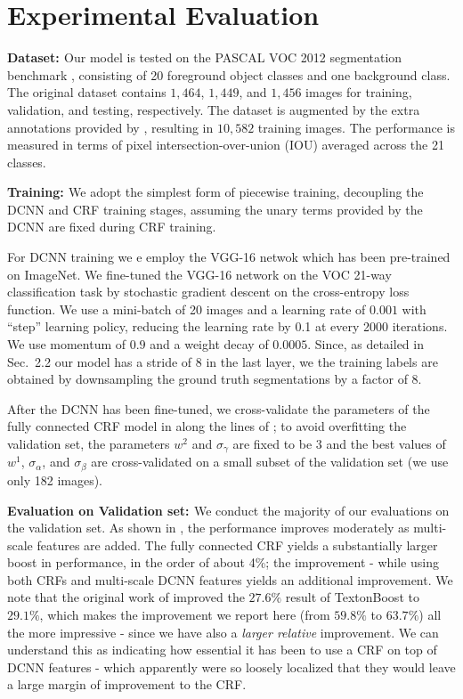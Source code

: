 \section{Experimental Evaluation}
\label{sec:experiments}

{\bf{Dataset: }} Our model is tested on the PASCAL VOC 2012 segmentation benchmark \citep{everingham2014pascal}, consisting of 20 foreground object classes and one background class. The original dataset contains $1,464$, $1,449$, and $1,456$ images for training, validation, and testing, respectively. The dataset is augmented by the extra annotations provided by \citep{hariharan2011semantic}, resulting in $10,582$ training images. The performance is measured in terms of pixel intersection-over-union (IOU) averaged across the 21 classes. 

{\bf{Training: }} We adopt the simplest form of piecewise training, decoupling the DCNN and CRF training stages, assuming the unary terms provided by the DCNN are fixed during CRF training. 

For DCNN training we e employ the VGG-16 netwok which has been pre-trained on ImageNet. We fine-tuned the VGG-16 network on the VOC 21-way classification task by stochastic gradient descent on the cross-entropy loss function. We use a mini-batch of 20 images and a learning rate of $0.001$ with ``step'' learning policy,  reducing the learning rate by 0.1 at every 2000 iterations. We use momentum of $0.9$ and a weight decay of $0.0005$. Since, as detailed in Sec.~2.2 our model has a stride of 8 in the last layer, we the training labels are obtained by downsampling the ground truth segmentations  by a factor of 8.

  After the DCNN has been fine-tuned, we cross-validate the   parameters of the fully connected CRF model in  along the lines of \citet{krahenbuhl2011efficient};
 to avoid overfitting the validation set, the parameters $w^2$ and $\sigma_\gamma$ are fixed to be $3$ and the best values of $w^1$, $\sigma_\alpha$, and $\sigma_\beta$ are cross-validated on a small subset of the validation set (we use only 182 images).  

{\bf{Evaluation on Validation set: }} We conduct the majority of our evaluations on the validation set. As shown in , the performance improves moderately as multi-scale features are added. The fully connected CRF yields a substantially larger boost in performance, in the order of about 4\%; the improvement - while using both CRFs and multi-scale DCNN features yields an additional improvement. 
We note that the original work of \citet{krahenbuhl2011efficient} improved the $27.6\%$
result of TextonBoost \citep{shotton2009textonboost} to $29.1\%$, which makes the  improvement we report here (from $59.8\%$ to $63.7\%$) all the more impressive - since we have also a {\emph{larger relative}} improvement. We can understand this as indicating how essential it has been to use  a CRF on top of DCNN features - which apparently were so loosely localized  that they would leave a large margin of improvement to the CRF. 

